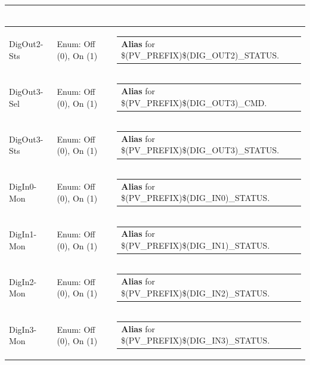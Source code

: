 \documentclass[openany]{article}
\begin{document}
\begin{longtable}{| m{4.5cm} m{2.5cm}  m{8.5cm} |}
\begin{tabular}{@{}m{6cm}@{}}
            \end{tabular} \hypertarget{}{}\\ \hline
        DigOut2-Sts & Enum: Off (0), On (1) & \begin{tabular}{@{}m{6cm}@{}}
                \textbf{\color{blue} Alias} for \$(PV\_PREFIX)\$(DIG\_OUT2)\_STATUS.
            \end{tabular} \hypertarget{pv:dig-out-3}{}\\ \hline
        DigOut3-Sel & Enum: Off (0), On (1) & \begin{tabular}{@{}m{6cm}@{}}
                \textbf{\color{blue} Alias} for \$(PV\_PREFIX)\$(DIG\_OUT3)\_CMD.
            \end{tabular} \hypertarget{}{}\\ \hline
        DigOut3-Sts & Enum: Off (0), On (1) & \begin{tabular}{@{}m{6cm}@{}}
                \textbf{\color{blue} Alias} for \$(PV\_PREFIX)\$(DIG\_OUT3)\_STATUS.
            \end{tabular} \hypertarget{pv:dig-in-0}{}\\ \hline
        DigIn0-Mon & Enum: Off (0), On (1) & \begin{tabular}{@{}m{6cm}@{}}
                \textbf{\color{blue} Alias} for \$(PV\_PREFIX)\$(DIG\_IN0)\_STATUS.
            \end{tabular} \hypertarget{pv:dig-in-1}{}\\ \hline
        DigIn1-Mon & Enum: Off (0), On (1) & \begin{tabular}{@{}m{6cm}@{}}
                \textbf{\color{blue} Alias} for \$(PV\_PREFIX)\$(DIG\_IN1)\_STATUS.
            \end{tabular} \hypertarget{pv:dig-in-2}{}\\ \hline
        DigIn2-Mon & Enum: Off (0), On (1) & \begin{tabular}{@{}m{6cm}@{}}
                \textbf{\color{blue} Alias} for \$(PV\_PREFIX)\$(DIG\_IN2)\_STATUS.
            \end{tabular} \hypertarget{pv:dig-in-3}{}\\ \hline
        DigIn3-Mon & Enum: Off (0), On (1) & \begin{tabular}{@{}m{6cm}@{}}
                \textbf{\color{blue} Alias} for \$(PV\_PREFIX)\$(DIG\_IN3)\_STATUS.
            \end{tabular} \hypertarget{pv:dig-in-4}{}\\ \hline

\end{longtable}
\end{document}
